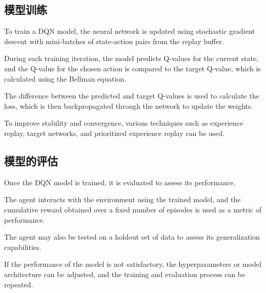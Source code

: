 \subsection{模型训练}

To train a DQN model, the neural network is updated using stochastic gradient descent with mini-batches of state-action pairs from the replay buffer.

During each training iteration, the model predicts Q-values for the current state, and the Q-value for the chosen action is compared to the target Q-value, which is calculated using the Bellman equation.

The difference between the predicted and target Q-values is used to calculate the loss, which is then backpropagated through the network to update the weights.

To improve stability and convergence, various techniques such as experience replay, target networks, and prioritized experience replay can be used.

\subsection{模型的评估}

Once the DQN model is trained, it is evaluated to assess its performance.

The agent interacts with the environment using the trained model, and the cumulative reward obtained over a fixed number of episodes is used as a metric of performance.

The agent may also be tested on a holdout set of data to assess its generalization capabilities.

If the performance of the model is not satisfactory, the hyperparameters or model architecture can be adjusted, and the training and evaluation process can be repeated.